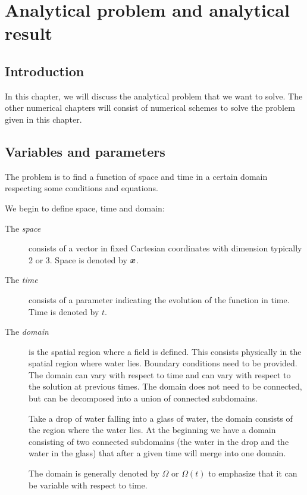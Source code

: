 \chapter{Analytical problem and analytical result}

\minitoc
\section*{Introduction}
In this chapter, we will discuss the analytical problem that we want to solve.
The other numerical chapters will consist of numerical schemes to solve the problem given in this chapter.

\section{Variables and parameters}

The problem is to find a function of space and time in a certain domain respecting some conditions and equations.

We begin to define space, time and domain:
\begin{description}
\item[The \emph{space}] consists of a vector in fixed Cartesian coordinates with dimension typically 2 or 3.
Space is denoted by ${\boldsymbol {x}}$.
\item[The \emph{time}] consists of a parameter indicating the evolution of the function in time.
Time is denoted by $t$.
\item[The \emph{domain}] is the spatial region where a field is defined. This consists physically in the spatial region where water lies.
Boundary conditions need to be provided.
The domain can vary with respect to time and can vary with respect to the solution at previous times.
The domain does not need to be connected, but can be decomposed into a union of connected subdomains.

\begin{example}
 Take a drop of water falling into a glass of water, the domain consists of the region where the water lies.
 At the beginning we have a domain consisting of two connected subdomains (the water in the drop and the water in the glass)
 that after a given time will merge into one domain.
\end{example}

The domain is generally denoted by $\Omega$ or $\Omega(t)$ to emphasize that it can be variable with respect to time.
\end{description}

